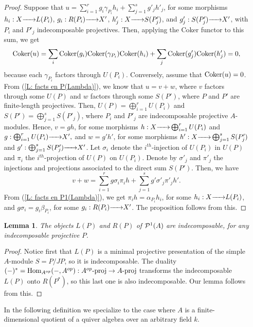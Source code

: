 \documentclass{article}
\newtheorem{lemma}[theorem]{Lemma}
\theoremstyle{definition}
\newcommand{\Coker}{{ \rm Coker }}
\newcommand{\Hom}{{ \rm Hom }}
\newcommand{\proj}{{\rm proj }}
\newcommand{\g}{\hbox{-}}
\newcommand{\rightmap}[1]{\smash{\mathop{\hbox to 
20pt{\rightarrowfill}}\limits^{#1}}}
\begin{document}
\begin{proof} Suppose that  $u=\sum_{i=1}^rg_i\gamma_{P_i}h_i+\sum_{j=1}^sg'_jh'_j$,  for some morphisms $h_i:X\rightmap{}L(P_i)$, $g_i:R(P_i)\rightmap{}X'$, $h'_j:X\rightmap{}S(P'_j)$, and $g'_j: S(P'_j)\rightmap{}X'$, with $P_i$ and  $P'_j$ indecomposable projectives. Then, applying the Coker functor to this sum,   we get
$$\Coker (u)=\sum_i\Coker(g_i)\Coker(\gamma_{P_i})\Coker (h_i)+\sum_j\Coker(g'_j)\Coker(h'_j)=0,$$
because each $\gamma_{P_i}$ factors through $U(P_i)$.  Conversely, assume that $\Coker(u)=0$. From (\ref{L: facts en P(Lambda)}), 
we know that $u=v+w$, where $v$ factors through some $U(P)$ and $w$ factors through some $S(P')$, where $P$ and $P'$ are finite-length projectives. Then, $U(P)=\bigoplus_{i=1}^r U(P_i)$ and $S(P')=\bigoplus_{j=1}^sS(P'_j)$, where $P_i$ and $P'_j$ are indecomposable projective $A$-modules.  Hence, $v=gh$, for some morphisms  
$h:X\rightmap{}\bigoplus_{i=1}^rU(P_i)$ and  $g: \bigoplus_{i=1}^rU(P_i)\rightmap{}X',$
and $w=g'h'$, for some morphisms 
$h':X\rightmap{}\bigoplus_{j=1}^sS(P'_j)$  and  $g': \bigoplus_{j=1}^sS(P'_j)\rightmap{}X'$. 
Let $\sigma_i$ denote the $i^{th}$-injection of $U(P_i)$ in $U(P)$ and $\pi_i$ the $i^{th}$-projection of $U(P)$ on  $U(P_i)$. Denote by $\sigma'_j$ and $\pi'_j$ the injections and projections associated to the direct sum $S(P')$. Then, we have 
$$v+w=\sum_{i=1}^rg\sigma_i\pi_i h+\sum_{j=1}^sg'\sigma'_j\pi'_jh'.$$  
From (\ref{L: facts en P1(Lambda)}), we get $\pi_i h=\alpha_{P_i}h_i$, for some $h_i:X\rightmap{}L(P_i)$, and $g\sigma_i= g_i\beta_{P_i}$, for some $g_i:R(P_i)\rightmap{}X'$. The proposition follows from this.  
\end{proof}


\begin{lemma}\label{L: L(Lambdaei), R(Lambdaej) inesc no isomorfos entre si} The objects  
$L(P)$ and $R(P)$ of ${\cal P}^1(A)$  are indecomposable, for any indecomposable projective $P$. 
\end{lemma}

\begin{proof} Notice first that $L(P)$ is a minimal projective presentation of the simple $A$-module $S=P/JP$, so it is indecomposable. The duality $(-)^*=\Hom_{A^{op}}(-,A^{op}): A^{op}\g \proj\rightarrow{}A\g\proj$ transforms  the indecomposable  $L(P)$ onto $R(P^*)$, so this last one is also indecomposable. Our lemma follows from this.  
\end{proof}


In the following definition we specialize to the case where $A$ is a finite-dimensional quotient of a quiver  algebra over an arbitrary field $k$.  
\end{document}
